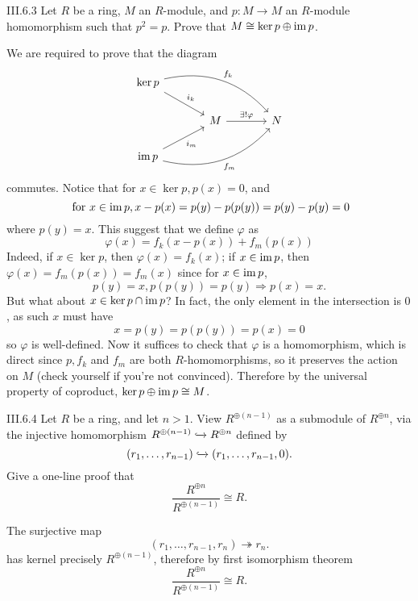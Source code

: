 \begin{problem}{III.6.3}
Let $R$ be a ring, $M$ an $R$-module, and $p : M \to M$ an $R$-module homomorphism such that $p^2 = p$. Prove that $M \cong \ker p \oplus \operatorname{im} p$.
\end{problem}
\begin{pf}
We are required to prove that the diagram
\[
\begin{tikzcd}[column sep=large]
\ker p \arrow[rd, "i_k"] \arrow[rrd, "f_k", bend left]  &                                &   \\
& M \arrow[r, "\exists!\varphi"] & N \\
\im p  \arrow[ru, "i_m"'] \arrow[rru, "f_m"', bend right] &                                &  
\end{tikzcd}
\]
commutes. Notice that for $x \in \ker p, p(x) = 0$, and
\[
\text{ for } x \in \operatorname{im} p, x - p(x) = p(y) - p(p(y)) = p(y) - p(y) = 0
\]
where $p(y) = x$. This suggest that we define $\varphi$ as 
\[
\varphi(x) = f_k(x - p(x)) + f_m(p(x))
\]
Indeed, if $x \in \ker p$, then $\varphi(x) = f_k(x)$; if $x \in \operatorname{im} p$, then $\varphi(x) = f_m(p(x)) = f_m(x)$ since for $x \in \operatorname{im} p$,
\[
p(y) = x, p(p(y)) = p(y) \Rightarrow p(x) = x.	
\]
But what about $x \in \ker p \cap \operatorname{im} p$? In fact, the only element in the intersection is $0$, as such $x$ must have
\[
x = p(y) = p(p(y)) = p(x) = 0
\]
so $\varphi$ is well-defined. Now it suffices to check that $\varphi$ is a homomorphism, which is direct since $p, f_k$ and $f_m$ are both $R$-homomorphisms, so it preserves the action on $M$ (check yourself if you're not convinced). Therefore by the universal property of coproduct, $\ker p \oplus \operatorname{im} p \cong M$.
\end{pf}

\begin{problem}{III.6.4}
Let $R$ be a ring, and let $n > 1$. View $R^{\oplus(n-1)}$ as a submodule of $R^{\oplus n}$, via the injective homomorphism $R^{\oplus(n-1)} \xhookrightarrow{} R^{\oplus n}$ defined by
\[
(r_1,\dotsc,r_{n-1}) \xhookrightarrow{}	(r_1,\dotsc,r_{n-1}, 0).
\]
Give a one-line proof that
\[
\frac{R^{\oplus n}}{R^{\oplus (n-1)}} \cong R.	
\] 
\end{problem}
\begin{pf}
The surjective map
\[
(r_1,\dotsc,r_{n-1}, r_n) \twoheadrightarrow r_n.
\]
has kernel precisely $R^{\oplus (n-1)}$, therefore by first isomorphism theorem
\[
\frac{R^{\oplus n}}{R^{\oplus (n-1)}} \cong R.	
\]  
\end{pf}

